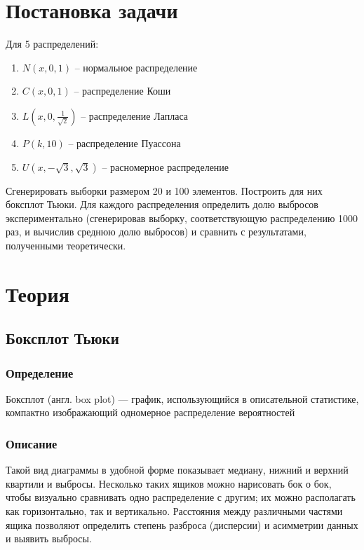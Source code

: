 \documentclass[a4paper]{article}
\begin{document}
    
    \tableofcontents
    \newpage
    \listoftables
    \newpage
\section {Постановка задачи}
\noindent Для 5 распределений:
\begin{enumerate}
	\item $N(x, 0, 1)$ -- нормальное распределение
	\item $C(x, 0, 1)$ -- распределение Коши
	\item $L(x, 0, \frac{1}{\sqrt{2}})$ -- распределение Лапласа
	\item $P(k, 10)$ -- распределение Пуассона
	\item $U(x, -\sqrt{3}, \sqrt{3})$ -- расномерное распределение
\end{enumerate}
Сгенерировать выборки размером 20 и 100 элементов.
Построить для них боксплот Тьюки.
Для каждого распределения определить долю выбросов экспериментально (сгенерировав выборку, соответствующую распределению 1000 раз, и вычислив среднюю долю выбросов) и сравнить с результатами, полученными теоретически.


\section {Теория}
\subsection{Боксплот Тьюки}
	\subsubsection{Определение}
	\noindent Боксплот (англ. box plot) — график, использующийся в описательной статистике, компактно изображающий одномерное распределение вероятностей

	\subsubsection{Описание}
	\noindent Такой вид диаграммы в удобной форме показывает медиану, нижний и верхний квартили и выбросы. Несколько таких ящиков можно нарисовать бок о бок, чтобы визуально сравнивать одно распределение с другим; их можно располагать как горизонтально, так и вертикально. Расстояния между различными частями ящика позволяют определить степень разброса (дисперсии) и асимметрии данных и выявить выбросы.
\end{document}
